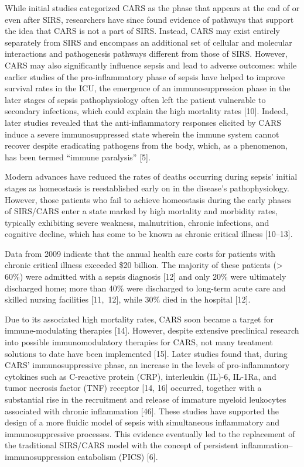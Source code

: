 While initial studies categorized CARS as the phase that appears at the
end of or even after SIRS, researchers have since found evidence of
pathways that support the idea that CARS is not a part of SIRS. Instead,
CARS may exist entirely separately from SIRS and encompass an additional
set of cellular and molecular interactions and pathogenesis pathways
different from those of SIRS. However, CARS may also significantly
influence sepsis and lead to adverse outcomes: while earlier studies of
the pro-inflammatory phase of sepsis have helped to improve survival
rates in the ICU, the emergence of an immunosuppression phase in the
later stages of sepsis pathophysiology often left the patient vulnerable
to secondary infections, which could explain the high mortality rates
{[}10{]}. Indeed, later studies revealed that the anti-inflammatory
responses elicited by CARS induce a severe immunosuppressed state
wherein the immune system cannot recover despite eradicating pathogens
from the body, which, as a phenomenon, has been termed ``immune
paralysis'' {[}5{]}.~

Modern advances have reduced the rates of deaths occurring during
sepsis' initial stages as homeostasis is reestablished early on in the
disease's pathophysiology. However, those patients who fail to achieve
homeostasis during the early phases of SIRS/CARS enter a state marked by
high mortality and morbidity rates, typically exhibiting severe
weakness, malnutrition, chronic infections, and cognitive decline, which
has come to be known as chronic critical illness {[}10--13{]}.~

Data from 2009 indicate that the annual health care costs for patients
with chronic critical illness exceeded \$20 billion. The majority of
these patients (\textgreater{} 60\%) were admitted with a sepsis
diagnosis {[}12{]} and only 20\% were ultimately discharged home; more
than 40\% were discharged to long-term acute care and skilled nursing
facilities {[}11,~12{]}, while 30\% died in the hospital {[}12{]}.~

Due to its associated high mortality rates, CARS soon became a target
for immune-modulating therapies {[}14{]}. However, despite extensive
preclinical research into possible immunomodulatory therapies for CARS,
not many treatment solutions to date have been implemented {[}15{]}.
Later studies found that, during CARS' immunosuppressive phase, an
increase in the levels of pro-inflammatory cytokines such as C-reactive
protein (CRP), interleukin (IL)-6, IL-1Ra, and tumor necrosis factor
(TNF) receptor {[}14, 16{]} occurred, together with a substantial rise
in the recruitment and release of immature myeloid leukocytes associated
with chronic inflammation {[}46{]}. These studies have supported the
design of a more fluidic model of sepsis with simultaneous inflammatory
and immunosuppressive processes. This evidence eventually led to the
replacement of the traditional SIRS/CARS model with the concept of
persistent inflammation--immunosuppression catabolism (PICS) {[}6{]}.~

